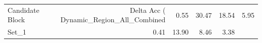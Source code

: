 \begin{tabular}{lrrrr}
\toprule
Candidate Block & Delta Acc (%
\midrule
Dynamic_Region_All_Combined & 0.55 & 30.47 & 18.54 & 5.95 \\
Set_1 & 0.41 & 13.90 & 8.46 & 3.38 \\
\bottomrule
\end{tabular}
